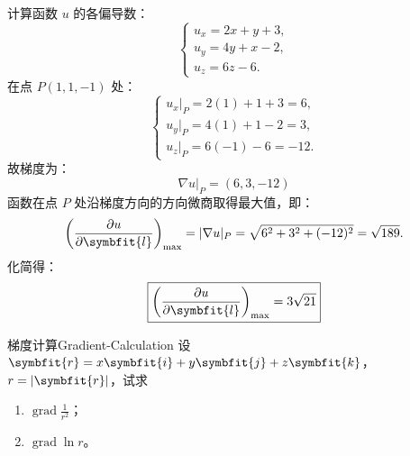 \begin{solution}
    计算函数 $u$ 的各偏导数：
    \begin{equation}
        \begin{cases}
            u_x = 2x + y + 3, \\
            u_y = 4y + x - 2, \\
            u_z = 6z - 6.
        \end{cases}
    \end{equation}
    在点 $P(1, 1, -1)$ 处：
    \begin{equation}
        \begin{cases}
            u_x|_P = 2(1) + 1 + 3 = 6, \\
            u_y|_P = 4(1) + 1 - 2 = 3, \\
            u_z|_P = 6(-1) - 6 = -12.
        \end{cases}
    \end{equation}
    故梯度为：
    \begin{equation}
        \boxed{\nabla u|_P = (6, 3, -12)}
    \end{equation}
    函数在点 $P$ 处沿梯度方向的方向微商取得最大值，即：
    \begin{equation}
        \left( \frac{\partial u}{\partial \symbfit{l}} \right)_{\max} = |\nabla u|_P = \sqrt{6^2 + 3^2 + (-12)^2} = \sqrt{189}.
    \end{equation}
    化简得：
    \begin{equation}
        \boxed{\left( \frac{\partial u}{\partial \symbfit{l}} \right)_{\max} = 3\sqrt{21}}
    \end{equation}
\end{solution}


\begin{problem}{梯度计算}{Gradient-Calculation}
    设 $\symbfit{r} = x\symbfit{i} + y\symbfit{j} + z\symbfit{k}$，$r = |\symbfit{r}|$，试求
    \begin{enumerate}
        \item $\operatorname{grad} \frac{1}{r^2}$；
        \item $\operatorname{grad} \ln r$。
    \end{enumerate}
\end{problem}

